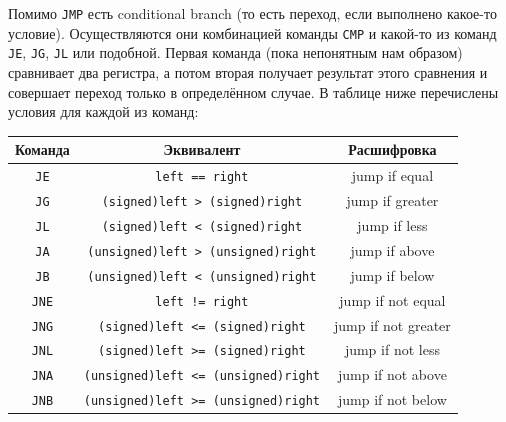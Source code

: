 \documentclass{article}
\newcommand{\asm}[1]{\texttt{#1}}
\begin{document}
    Помимо \asm{JMP} есть conditional branch (то есть переход, если выполнено какое-то условие). Осуществляются они комбинацией команды \asm{CMP} и какой-то из команд \asm{JE}, \asm{JG}, \asm{JL} или подобной. Первая команда (пока непонятным нам образом) сравнивает два регистра, а потом вторая получает результат этого сравнения и совершает переход только в определённом случае. В таблице ниже перечислены условия для каждой из команд:
    \begin{center}
        \begin{tabular}{|c|c|c|}
            \hline
            Команда & Эквивалент & Расшифровка\\
            \hline
            \asm{JE} & \texttt{left == right} & jump if equal\\
            \asm{JG} & \texttt{(signed)left > (signed)right} & jump if greater\\
            \asm{JL} & \texttt{(signed)left < (signed)right} & jump if less\\
            \asm{JA} & \texttt{(unsigned)left > (unsigned)right} & jump if above\\
            \asm{JB} & \texttt{(unsigned)left < (unsigned)right} & jump if below\\
            \hline
            \asm{JNE} & \texttt{left != right} & jump if not equal\\
            \asm{JNG} & \texttt{(signed)left <= (signed)right} & jump if not greater\\
            \asm{JNL} & \texttt{(signed)left >= (signed)right} & jump if not less\\
            \asm{JNA} & \texttt{(unsigned)left <= (unsigned)right} & jump if not above\\
            \asm{JNB} & \texttt{(unsigned)left >= (unsigned)right} & jump if not below\\
            \hline
        \end{tabular}
    \end{center}
\end{document}
